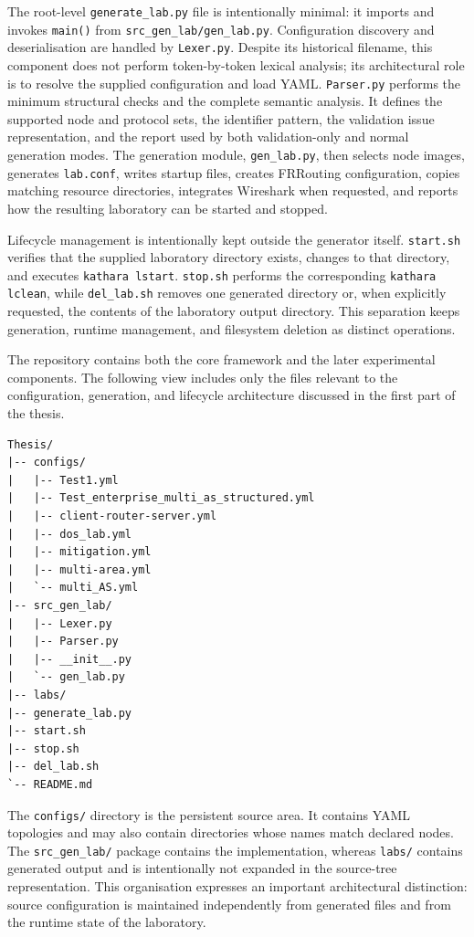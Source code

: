 The root-level \texttt{generate\_lab.py} file is intentionally minimal: it
imports and invokes \texttt{main()} from
\texttt{src\_gen\_lab/gen\_lab.py}. Configuration discovery and
deserialisation are handled by \texttt{Lexer.py}. Despite its historical
filename, this component does not perform token-by-token lexical analysis; its
architectural role is to resolve the supplied configuration and load YAML.
\texttt{Parser.py} performs the minimum structural checks and the complete
semantic analysis. It defines the supported node and protocol sets, the
identifier pattern, the validation issue representation, and the report used
by both validation-only and normal generation modes. The generation module,
\texttt{gen\_lab.py}, then selects node images, generates \texttt{lab.conf},
writes startup files, creates FRRouting configuration, copies matching
resource directories, integrates Wireshark when requested, and reports how the
resulting laboratory can be started and stopped.

Lifecycle management is intentionally kept outside the generator itself.
\texttt{start.sh} verifies that the supplied laboratory directory exists,
changes to that directory, and executes \texttt{kathara lstart}.
\texttt{stop.sh} performs the corresponding \texttt{kathara lclean}, while
\texttt{del\_lab.sh} removes one generated directory or, when explicitly
requested, the contents of the laboratory output directory. This separation
keeps generation, runtime management, and filesystem deletion as distinct
operations.

The repository contains both the core framework and the later experimental
components. The following view includes only the files relevant to the
configuration, generation, and lifecycle architecture discussed in the first
part of the thesis.

\begin{lstlisting}[caption={Repository structure relevant to the framework core.},label={lst:repository-structure}]
Thesis/
|-- configs/
|   |-- Test1.yml
|   |-- Test_enterprise_multi_as_structured.yml
|   |-- client-router-server.yml
|   |-- dos_lab.yml
|   |-- mitigation.yml
|   |-- multi-area.yml
|   `-- multi_AS.yml
|-- src_gen_lab/
|   |-- Lexer.py
|   |-- Parser.py
|   |-- __init__.py
|   `-- gen_lab.py
|-- labs/
|-- generate_lab.py
|-- start.sh
|-- stop.sh
|-- del_lab.sh
`-- README.md
\end{lstlisting}

The \texttt{configs/} directory is the persistent source area. It contains YAML
topologies and may also contain directories whose names match declared nodes.
The \texttt{src\_gen\_lab/} package contains the implementation, whereas
\texttt{labs/} contains generated output and is intentionally not expanded in
the source-tree representation. This organisation expresses an important
architectural distinction: source configuration is maintained independently
from generated files and from the runtime state of the laboratory.

